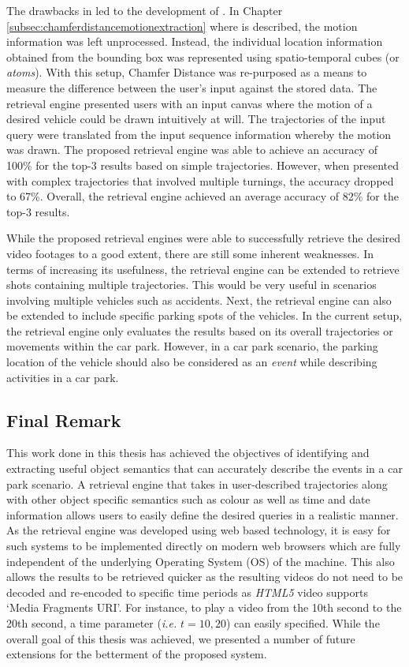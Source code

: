 The drawbacks in \versionOneRet led to the development of \versionTwoRet. In Chapter \ref{subsec:chamferdistancemotionextraction} where \versionTwoRet is described, the motion information was left unprocessed. Instead, the individual location information obtained from the bounding box was represented using spatio-temporal cubes (or \textit{atoms}). With this setup, Chamfer Distance was re-purposed as a means to measure the difference between the user's input against the stored data. The retrieval engine presented users with an input canvas where the motion of a desired vehicle could be drawn intuitively at will. The trajectories of the input query were translated from the input sequence information whereby the motion was drawn. The proposed retrieval engine was able to achieve an accuracy of 100\% for the top-3 results based on simple trajectories. However, when presented with complex trajectories that involved multiple turnings, the accuracy dropped to 67\%. Overall, the retrieval engine achieved an average accuracy of 82\% for the top-3 results.

While the proposed retrieval engines were able to successfully retrieve the desired video footages to a good extent, there are still some inherent weaknesses. In terms of increasing its usefulness, the retrieval engine can be extended to retrieve shots containing multiple trajectories. This would be very useful in scenarios involving multiple vehicles such as accidents. Next, the retrieval engine can also be extended to include specific parking spots of the vehicles. In the current setup, the retrieval engine only evaluates the results based on its overall trajectories or movements within the car park. However, in a car park scenario, the parking location of the vehicle should also be considered as an \emph{event} while describing activities in a car park.

\subsection*{Final Remark}
This work done in this thesis has achieved the objectives of identifying and extracting useful object semantics that can accurately describe the events in a car park scenario. A retrieval engine that takes in user-described trajectories along with other object specific semantics such as colour as well as time and date information allows users to easily define the desired queries in a realistic manner. As the retrieval engine was developed using web based technology, it is easy for such systems to be implemented directly on modern web browsers which are fully independent of the underlying Operating System (OS) of the machine. This also allows the results to be retrieved quicker as the resulting videos do not need to be decoded and re-encoded to specific time periods as \emph{HTML5} video supports `Media Fragments URI'. For instance, to play a video from the 10th second to the 20th second, a time parameter (\emph{i.e.} $t=10,20$) can easily specified. While the overall goal of this thesis was achieved, we presented a number of future extensions for the betterment of the proposed system.